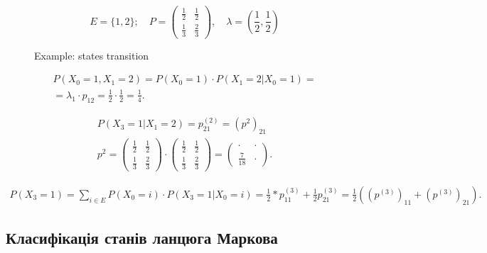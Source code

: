 \begin{example}
  \[ E = \{1, 2\} ; \quad P = \begin{pmatrix}
    \frac{1}{2} & \frac{1}{2} \\
    \frac{1}{3} & \frac{2}{3}
  \end{pmatrix} , \quad \lambda = \left( \frac{1}{2}, \frac{1}{2} \right)  \] 
  \begin{figure}[ht]
    \centering
    \caption{Example: states transition}
    \label{fig:example-states-transition}
  \end{figure}

  \begin{align*}
    P\left( X_0 = 1, X_1 = 2 \right) = P\left( X_0 = 1 \right) \cdot 
    P\left( X_1 = 2 | X_0 = 1 \right) = \\
    = \lambda _1 \cdot  p_{12} = \frac{1}{2} \cdot  \frac{1}{2} = \frac{1}{4}
  .\end{align*}

  \begin{align*}
    P\left( X_3 = 1 | X_1 = 2 \right) = p^{(2)}_{21} = \left( p^{2} \right) _{21} \\
    p^2 = \begin{pmatrix} \frac{1}{2} & \frac{1}{2} \\ \frac{1}{3} & \frac{2}{3} \end{pmatrix} \cdot \begin{pmatrix} 
  \frac{1}{2} & \frac{1}{2} \\ \frac{1}{3} & \frac{2}{3} \end{pmatrix} = 
  \begin{pmatrix} \cdot & \cdot \\ \boxed{\frac{7}{18}} & \cdot \end{pmatrix}
  .\end{align*}

  \begin{align*}
    P\left( X_3 = 1 \right) = \sum_{i \in E}^{} P\left( X_0 = i \right) \cdot 
    P\left( X_3 = 1 | X_0 = i \right) = \frac{1}{2} * p^{(3)}_{11} + \frac{1}{2}
    p^{(3)}_{21} = \frac{1}{2}\left( (p^{(3)})_{11} + (p^{(3)})_{21} \right) 
  .\end{align*}
\end{example}


\subsection{Класифікація станів ланцюга Маркова}

